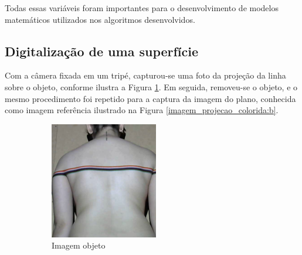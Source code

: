 \documentclass[a4paper, 12pt]{article}
\begin{document}
Todas essas variáveis foram importantes para o desenvolvimento de modelos matemáticos utilizados nos algoritmos desenvolvidos. 



\subsection{Digitalização de uma superfície}

Com a câmera fixada em um tripé, capturou-se uma foto da projeção da linha sobre o objeto, conforme ilustra a Figura \ref{imagem_projecao_colorida:a}. Em seguida, removeu-se o objeto, e o mesmo procedimento foi repetido para a captura da imagem do plano, conhecida como imagem referência ilustrado na Figura \ref{imagem_projecao_colorida:b}. 

\begin{figure}[h!]
	\centering
    \begin{subfigure}{.35\textwidth}
      \centering
      \includegraphics[width=.85\linewidth]{imagem_projecao_colorida_a.png} 
      \caption{Imagem objeto}
      \label{imagem_projecao_colorida:a}
    \end{subfigure}
    \begin{subfigure}{.35\textwidth}
      \centering

\end{subfigure}
\end{figure}
\end{document}
